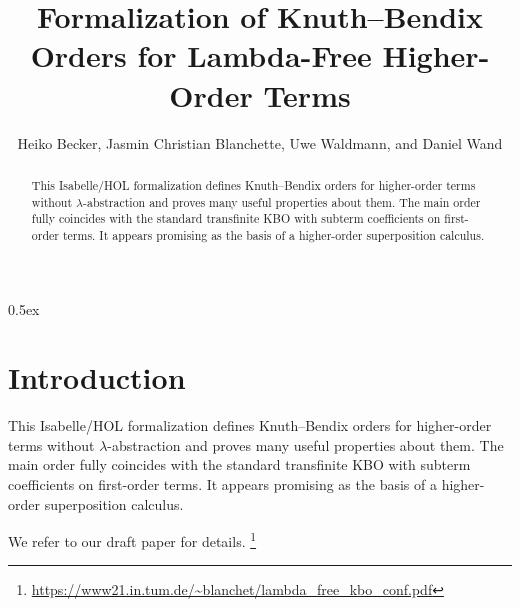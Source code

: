 \documentclass[10pt,a4paper]{article}
\begin{document}
\title{Formalization of Knuth--Bendix Orders for Lambda-Free Higher-Order Terms}
\author{Heiko Becker, Jasmin Christian Blanchette, Uwe Waldmann, and Daniel Wand}

\maketitle

\begin{abstract}
\noindent
This Isabelle/HOL formalization defines Knuth--Bendix orders for higher-order
terms without $\lambda$-ab\-strac\-tion and proves many useful properties about
them. The main order fully coincides with the standard transfinite KBO with
subterm coefficients on first-order terms. It appears promising as the basis
of a higher-order superposition calculus.
\end{abstract}

\tableofcontents

\parindent 0pt
\parskip 0.5ex

\section{Introduction}

This Isabelle/HOL formalization defines Knuth--Bendix orders for higher-order
terms without $\lambda$-abstraction and proves many useful properties about
them. The main order fully coincides with the standard transfinite KBO with
subterm coefficients on first-order terms. It appears promising as the basis
of a higher-order superposition calculus.

We refer to our draft paper for details.%
\footnote{\url{https://www21.in.tum.de/~blanchet/lambda_free_kbo_conf.pdf}}



%
%

%
%
\end{document}
